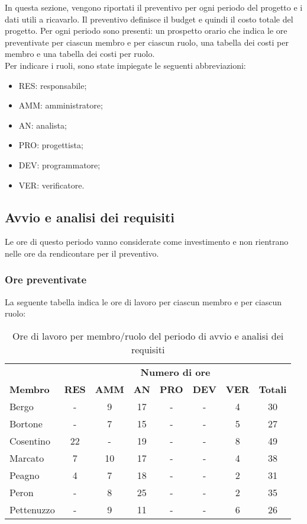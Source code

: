 In questa sezione, vengono riportati il preventivo per ogni periodo del progetto e i dati utili a ricavarlo. Il preventivo definisce il budget e quindi il costo totale del progetto. Per ogni periodo sono presenti: un prospetto orario che indica le ore preventivate per ciascun membro e per ciascun ruolo, una tabella dei costi per membro e una tabella dei costi per ruolo.\\
Per indicare i ruoli, sono state impiegate le seguenti abbreviazioni:
\begin{itemize}
	\item RES: responsabile;
	\item AMM: amministratore;
	\item AN: analista;
	\item PRO: progettista;
	\item DEV: programmatore;
	\item VER: verificatore.
\end{itemize}

\newpage
\subsection{Avvio e analisi dei requisiti}
	Le ore di questo periodo vanno considerate come investimento e non rientrano nelle ore da rendicontare per il preventivo.
	\subsubsection{Ore preventivate}
		La seguente tabella indica le ore di lavoro per ciascun membro e per ciascun ruolo:
		\begin{table}[h]
		\centering
		\begin{tabular}{| l | c c c c c c | c |}
			\rowcolor{LightBlue}
			& \multicolumn{7}{c}{\textbf{\color{white}Numero di ore}}	\\
	
			\rowcolor{LightBlue}
			\textbf{\color{white}Membro}
			& \textbf{\color{white}RES}
			& \textbf{\color{white}AMM}
			& \textbf{\color{white}AN}
			& \textbf{\color{white}PRO}
			& \textbf{\color{white}DEV}
			& \textbf{\color{white}VER}
			& \textbf{\color{white}Totali}\\
	
			Bergo 				& - & 9 & 17 & - & - & 4 & 30\\
			Bortone 			& - & 7 & 15	& - & - & 5 & 27\\
			Cosentino 		& 22 & - & 19 & - & - & 8 & 49\\
			Marcato 			& 7 & 10 & 17 & - & - & 4 & 38\\
			Peagno 			& 4 & 7 & 18 & - & - & 2 & 31\\
			Peron 				& - & 8 & 25 & - & - & 2 & 35\\ \hline
			Pettenuzzo 	& - & 9 & 11 & - & - & 6 & 26\\ \hline
		\end{tabular}
		\caption{Ore di lavoro per membro/ruolo del periodo di avvio e analisi dei requisiti}
		\end{table}
		
